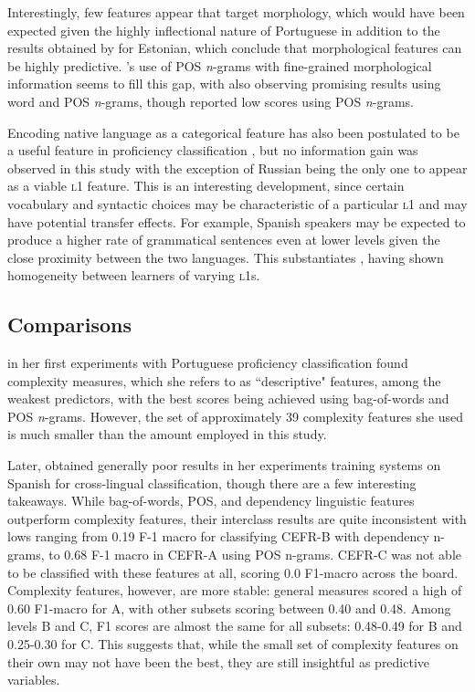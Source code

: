 Interestingly, few features appear that target morphology, which would have been expected given the highly inflectional nature of Portuguese in addition to the results obtained by \cite{vajjala2014-estonian} for Estonian, which conclude that morphological features can be highly predictive. 's use of POS \textit{n}-grams with fine-grained morphological information seems to fill this gap, with \cite{vajjala2018-cefr} also observing promising results using word and POS \textit{n}-grams, though \cite{vajjala2014-estonian} reported low scores using POS \textit{n}-grams.

Encoding native language as a categorical feature has also been postulated to be a useful feature in proficiency classification \citep{vajjala2017-features}, but no information gain was observed in this study with the exception of Russian being the only one to appear as a viable {\scshape l1} feature. This is an interesting development, since certain vocabulary and syntactic choices may be characteristic of a particular {\scshape l1} and may have potential transfer effects. For example, Spanish speakers may be expected to produce a higher rate of grammatical sentences even at lower levels given the close proximity between the two languages. This substantiates \cite{crossley2011}, having shown homogeneity between learners of varying {\scshape l1}s.

\subsection{Comparisons}

 in her first experiments with Portuguese proficiency classification found complexity measures, which she refers to as ``descriptive" features, among the weakest predictors, with the best scores being achieved using bag-of-words and POS \textit{n}-grams. However, the set of approximately 39 complexity features she used is much smaller than the amount employed in this study.

Later, \cite{delrio2019b} obtained generally poor results in her experiments training systems on Spanish for cross-lingual classification, though there are a few interesting takeaways. While bag-of-words, POS, and dependency linguistic features outperform complexity features, their interclass results are quite inconsistent with lows ranging from 0.19 F-1 macro for classifying CEFR-B with dependency n-grams, to 0.68 F-1 macro in CEFR-A using POS n-grams. CEFR-C was not able to be classified with these features at all, scoring 0.0 F1-macro across the board. Complexity features, however, are more stable: general measures scored a high of 0.60 F1-macro for A, with other subsets scoring between 0.40 and 0.48. Among levels B and C, F1 scores are almost the same for all subsets: 0.48-0.49 for B and 0.25-0.30 for C. This suggests that, while the small set of complexity features on their own may not have been the best, they are still insightful as predictive variables.

